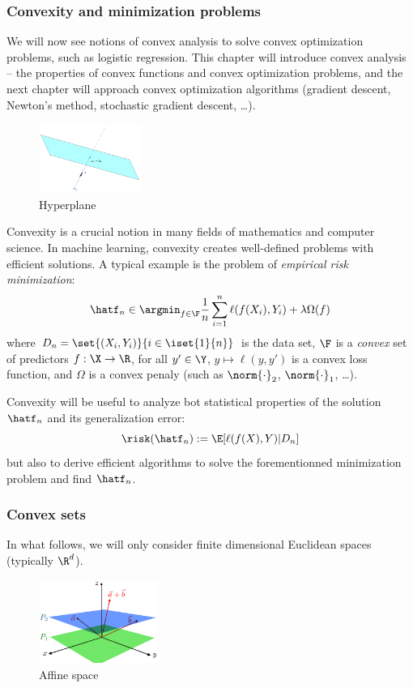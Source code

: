 \documentclass[toc, titlepaged]{../cs-classes/cs-classes}
\begin{document}
\subsubsection{Convexity and minimization problems}
We will now see notions of convex analysis to solve convex optimization problems, such as logistic regression. This chapter will introduce convex analysis -- the properties of convex functions and convex optimization problems, and the next chapter will approach convex optimization algorithms (gradient descent, Newton's method, stochastic gradient descent, \dots).
\begin{figure}
    \centering
    \captionsetup{justification=centering}
    \includegraphics[width=0.3\textwidth]{images/hyperplane.png}
    \caption{Hyperplane}
\end{figure}

Convexity is a crucial notion in many fields of mathematics and computer science. In machine learning, convexity creates well-defined problems with efficient solutions. A typical example is the problem of \emph{empirical risk minimization}:
\begin{equation*}
    \hatf_n\in\argmin_{f\in\F}\frac{1}{n}\sum_{i=1}^n\ell(f(X_i), Y_i)+\lambda\Omega(f)
\end{equation*}
where $D_n=\set{(X_i, Y_i)}{i\in\iset{1}{n}}$ is the data set, $\F$ is a \emph{convex} set of predictors $f:\X\to\R$, for all $y'\in\Y$, $y\mapsto\ell(y, y')$ is a convex loss function, and $\Omega$ is a convex penaly (such as $\norm{\cdot}_2$, $\norm{\cdot}_1$, \dots).

Convexity will be useful to analyze bot statistical properties of the solution $\hatf_n$ and its generalization error:
\begin{equation*}
    \risk(\hatf_n):=\E[\ell(f(X), Y)|D_n]
\end{equation*}
but also to derive efficient algorithms to solve the forementionned minimization problem and find $\hatf_n$.

\subsubsection{Convex sets}
In what follows, we will only consider finite dimensional Euclidean spaces (typically $\R^d$).
\begin{figure}
    \centering
        \captionsetup{justification=centering}
        \includegraphics[width=0.35\textwidth]{images/affine-space.png}
        \caption{Affine space}
\end{figure}
\end{document}
